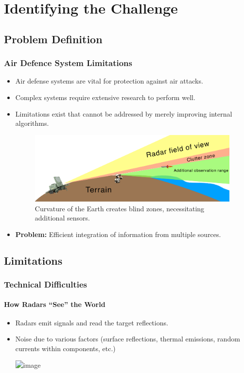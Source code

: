 \section{Identifying the Challenge}

\subsection*{Problem Definition}\begin{frame}\frametitle{Air Defence System Limitations}
    \begin{itemize}
        \item Air defense systems are vital for protection against air attacks.
        \item Complex systems require extensive research to perform well.
        \pause
        \item Limitations exist that cannot be addressed by merely improving internal algorithms.
        \begin{figure}
            \centering
            \includegraphics[width=0.9\linewidth]{pic/radar-presentation.png}
            \caption{Curvature of the Earth creates blind zones, necessitating additional sensors.}
        \end{figure}
        \pause
        \item \textbf{Problem:} Efficient integration of information from multiple sources.
    \end{itemize}
\end{frame}

\subsection*{Limitations}\begin{frame}[t]\frametitle{Technical Difficulties}
\framesubtitle{How Radars ``See'' the World}
    \begin{itemize}[<+->]
        \item<1-> Radars emit signals and read the target reflections.
        \item<2-> \alert{Noise} due to various factors (surface reflections, thermal emissions, random currents within components, etc.)
            \begin{center}
                \includegraphics<3>[width=0.5\linewidth]{pic/assignment-problem-red.png}
            \end{center}
    \end{itemize}
\end{frame}

